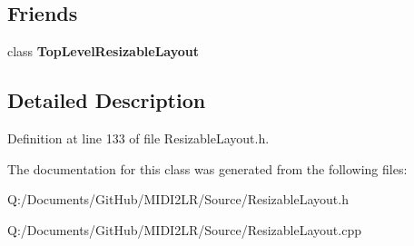 \subsection*{Friends}
\begin{DoxyCompactItemize}
\item 
class {\bfseries Top\+Level\+Resizable\+Layout}\hypertarget{class_resizable_layout_af7f3636f234d1cdf71500ab6a6963b6f}{}\label{class_resizable_layout_af7f3636f234d1cdf71500ab6a6963b6f}

\end{DoxyCompactItemize}


\subsection{Detailed Description}


Definition at line 133 of file Resizable\+Layout.\+h.



The documentation for this class was generated from the following files\+:\begin{DoxyCompactItemize}
\item 
Q\+:/\+Documents/\+Git\+Hub/\+M\+I\+D\+I2\+L\+R/\+Source/Resizable\+Layout.\+h\item 
Q\+:/\+Documents/\+Git\+Hub/\+M\+I\+D\+I2\+L\+R/\+Source/Resizable\+Layout.\+cpp\end{DoxyCompactItemize}

